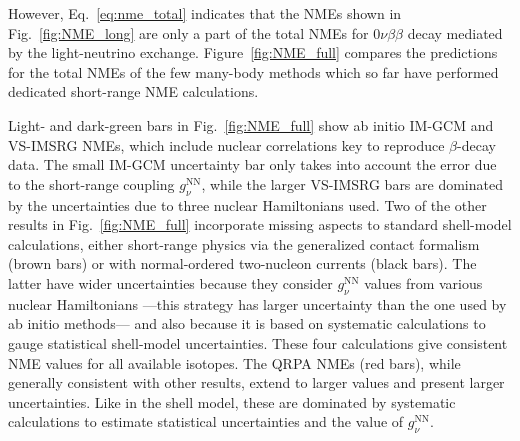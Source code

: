 However, Eq.~\eqref{eq:nme_total} indicates that the NMEs shown in Fig.~\ref{fig:NME_long} are only a part of the total NMEs for $0\nu\beta\beta$ decay mediated by the light-neutrino exchange. Figure~\ref{fig:NME_full} compares the predictions for the total NMEs of the few many-body methods which so far have performed dedicated short-range NME calculations.

Light- and dark-green bars in Fig.~\ref{fig:NME_full} show ab initio IM-GCM and VS-IMSRG NMEs, which include nuclear correlations key to reproduce $\beta$-decay data. The small IM-GCM uncertainty bar only takes into account the error due to the short-range coupling $g^{\text{NN}}_\nu$, while the larger VS-IMSRG bars are dominated by the uncertainties due to three nuclear Hamiltonians used. Two of the other results in Fig.~\ref{fig:NME_full} incorporate missing aspects to standard shell-model calculations, either short-range physics via the generalized contact formalism (brown bars) or with normal-ordered two-nucleon currents (black bars). The latter have wider uncertainties because they consider $g^{\text{NN}}_\nu$ values from various nuclear Hamiltonians ---this strategy has larger uncertainty than the one used by ab initio methods--- and also because it is based on systematic calculations to gauge statistical shell-model uncertainties. These four calculations give consistent NME values for all available isotopes. The QRPA NMEs (red bars), while generally consistent with other results, extend to larger values and present larger uncertainties. Like in the shell model, these are dominated by systematic calculations to estimate statistical uncertainties and the value of $g^{\text{NN}}_\nu$.

